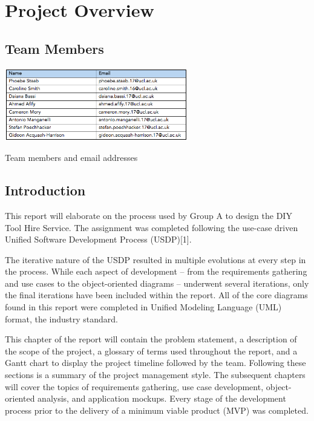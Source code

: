 \hypertarget{project-overview}{%
\section{Project Overview}\label{project-overview}}

\hypertarget{team-members}{%
\subsection{Team Members}\label{team-members}}

\begin{table}[H]
      \centering
      \includegraphics[trim = 0 0 0 0, clip, width=0.6\textwidth]{TempImg/teamtable.png}
      \caption{Team members and email addresses}
\label{conreq}
 \end{table}

\hypertarget{introduction}{%
\subsection{Introduction}\label{introduction}}

This report will elaborate on the process used by Group A to design the
DIY Tool Hire Service. The assignment was completed following the
use-case driven Unified Software Development Process (USDP){[}1{]}.

The iterative nature of the USDP resulted in multiple evolutions at
every step in the process. While each aspect of development -- from the
requirements gathering and use cases to the object-oriented diagrams --
underwent several iterations, only the final iterations have been
included within the report. All of the core diagrams found in this
report were completed in Unified Modeling Language (UML) format, the
industry standard.

This chapter of the report will contain the problem statement, a
description of the scope of the project, a glossary of terms used
throughout the report, and a Gantt chart to display the project timeline
followed by the team. Following these sections is a summary of the
project management style. The subsequent chapters will cover the topics
of requirements gathering, use case development, object-oriented
analysis, and application mockups. Every stage of the development
process prior to the delivery of a minimum viable product (MVP) was
completed.

